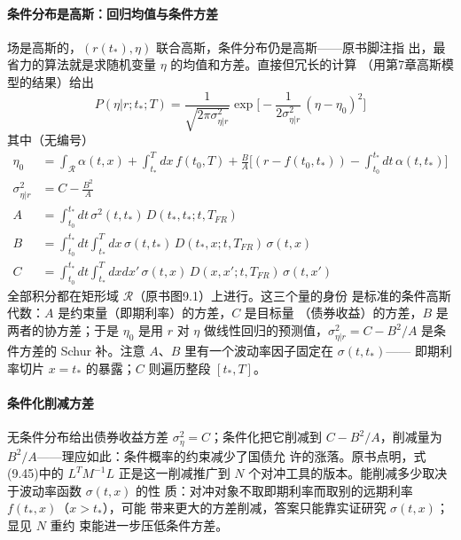 \paragraph{条件分布是高斯：回归均值与条件方差}
场是高斯的，$(r(t_*),\eta)$ 联合高斯，条件分布仍是高斯——原书脚注指
出，最省力的算法就是求随机变量 $\eta$ 的均值和方差。直接但冗长的计算
（用第7章高斯模型的结果）给出
\begin{equation*}
P(\eta|r;t_*;T)=\frac{1}{\sqrt{2\pi\sigma_{\eta|r}^{2}}}
\exp\biggl[-\frac{1}{2\sigma_{\eta|r}^{2}}\,(\eta-\eta_0)^2\biggr]
\tag{9.52}
\end{equation*}
其中（无编号）
\begin{align*}
\eta_0&=\int_{\mathcal{R}}\alpha(t,x)+\int_{t_*}^{T}dx\,f(t_0,T)
+\frac{B}{A}\biggl[(r-f(t_0,t_*))-\int_{t_0}^{t_*}dt\,\alpha(t,t_*)\biggr]\\
\sigma_{\eta|r}^{2}&=C-\frac{B^2}{A}\\
A&=\int_{t_0}^{t_*}dt\,\sigma^2(t,t_*)\,D(t_*,t_*;t,T_{FR})\\
B&=\int_{t_0}^{t_*}dt\int_{t_*}^{T}dx\,\sigma(t,t_*)\,
D(t_*,x;t,T_{FR})\,\sigma(t,x)\\
C&=\int_{t_0}^{t_*}dt\int_{t_*}^{T}dxdx'\,\sigma(t,x)\,
D(x,x';t,T_{FR})\,\sigma(t,x')
\end{align*}
全部积分都在矩形域 $\mathcal{R}$（原书图9.1）上进行。这三个量的身份
是标准的条件高斯代数：$A$ 是约束量（即期利率）的方差，$C$ 是目标量
（债券收益）的方差，$B$ 是两者的协方差；于是 $\eta_0$ 是用 $r$ 对
$\eta$ 做线性回归的预测值，$\sigma_{\eta|r}^2=C-B^2/A$ 是条件方差的
Schur 补。注意 $A$、$B$ 里有一个波动率因子固定在 $\sigma(t,t_*)$——
即期利率切片 $x=t_*$ 的暴露；$C$ 则遍历整段 $[t_*,T]$。

\paragraph{条件化削减方差}
无条件分布给出债券收益方差 $\sigma_\eta^2=C$；条件化把它削减到
$C-B^2/A$，削减量为 $B^2/A$——理应如此：条件概率的约束减少了国债允
许的涨落。原书点明，式(9.45)中的 $L^{T}M^{-1}L$ 正是这一削减推广到
$N$ 个对冲工具的版本。能削减多少取决于波动率函数 $\sigma(t,x)$ 的性
质：对冲对象不取即期利率而取别的远期利率 $f(t_*,x)$（$x>t_*$），可能
带来更大的方差削减，答案只能靠实证研究 $\sigma(t,x)$；显见 $N$ 重约
束能进一步压低条件方差。

